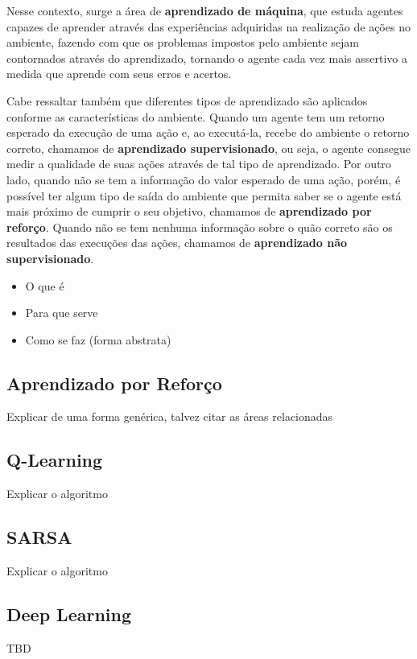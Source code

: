 Nesse contexto, surge a área de \textbf{aprendizado de máquina}, que estuda
agentes capazes de aprender através das experiências adquiridas na realização de
ações no ambiente, fazendo com que os problemas impostos pelo ambiente sejam
contornados através do aprendizado, tornando o agente cada vez mais assertivo a
medida que aprende com seus erros e acertos.

Cabe ressaltar também que diferentes tipos de aprendizado são aplicados conforme
as características do ambiente. Quando um agente tem um retorno esperado da
execução de uma ação e, ao executá-la, recebe do ambiente o retorno correto,
chamamos de \textbf{aprendizado supervisionado}, ou seja, o agente consegue
medir a qualidade de suas ações através de tal tipo de aprendizado. Por outro
lado, quando não se tem a informação do valor esperado de uma ação, porém, é
possível ter algum tipo de saída do ambiente que permita saber se o agente está
mais próximo de cumprir o seu objetivo, chamamos de \textbf{aprendizado por
reforço}. Quando não se tem nenhuma informação sobre o quão correto são os
resultados das execuções das ações, chamamos de \textbf{aprendizado não
supervisionado}. \cite{Russell:1995:AIM:193191}

\begin{itemize} \item O que é \item Para que serve \item Como se faz (forma
abstrata) \end{itemize}

\subsection{Aprendizado por Reforço}

Explicar de uma forma genérica, talvez citar as áreas relacionadas

\subsection{Q-Learning}

Explicar o algoritmo

\subsection{SARSA}

Explicar o algoritmo

\subsection{Deep Learning}

TBD
